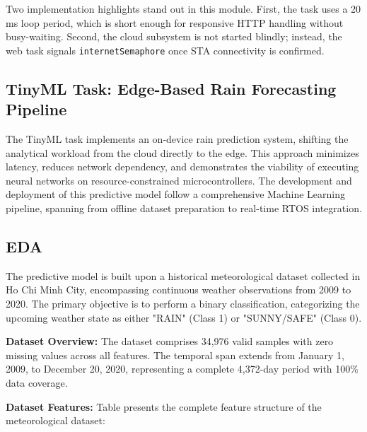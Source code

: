 Two implementation highlights stand out in this module. First, the task uses a
20 ms loop period, which is short enough for responsive HTTP handling without
busy-waiting. Second, the cloud subsystem is not started blindly; instead, the
web task signals \texttt{internetSemaphore} once STA connectivity is confirmed.


\subsection{TinyML Task: Edge-Based Rain Forecasting Pipeline}

The TinyML task implements an on-device rain prediction system, shifting the analytical workload from the cloud directly to the edge. This approach minimizes latency, reduces network dependency, and demonstrates the viability of executing neural networks on resource-constrained microcontrollers. The development and deployment of this predictive model follow a comprehensive Machine Learning pipeline, spanning from offline dataset preparation to real-time RTOS integration.

\subsection*{EDA}
The predictive model is built upon a historical meteorological dataset collected in Ho Chi Minh City, encompassing continuous weather observations from 2009 to 2020. The primary objective is to perform a binary classification, categorizing the upcoming weather state as either "RAIN" (Class 1) or "SUNNY/SAFE" (Class 0).

\textbf{Dataset Overview:} The dataset comprises 34,976 valid samples with zero missing values across all features. The temporal span extends from January 1, 2009, to December 20, 2020, representing a complete 4,372-day period with 100\% data coverage.

\noindent\textbf{Dataset Features:} Table presents the complete feature structure of the meteorological dataset:

